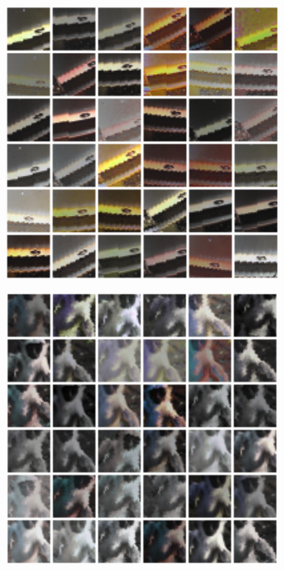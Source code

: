 \documentclass{article} %
\begin{document}
\begin{figure}[h]
\centering
\begin{subfigure}{0.3\textwidth}
  \centering
  \includegraphics[width=\textwidth]{figs/patch_noflip_lines.png}
\end{subfigure}
\begin{subfigure}{0.3\textwidth}
  \centering
  \includegraphics[width=\textwidth]{figs/patch_noflip_lemur.png}

\end{subfigure}
\end{figure}
\end{document}
